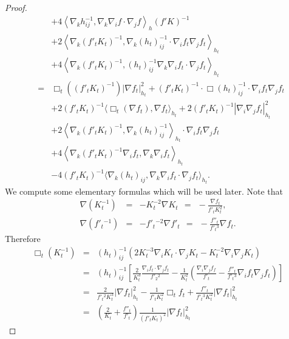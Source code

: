 \documentclass{amsart}
\theoremstyle{definition}
\theoremstyle{remark}
\numberwithin{equation}{section}
\begin{document}
\begin{proof}
\begin{eqnarray*}
&&+4\left\langle\nabla_{k}h^{-1}_{ij},\nabla_{k}\nabla_{i}f\cdot\nabla_{j}f
\right\rangle_{h}(f'K)^{-1}\\
&&+2\left\langle\nabla_{k}(f'_{t}K_{t})^{-1},\nabla_{k}(h_{t})^{-1}_{ij}
\cdot\nabla_{i}f_{t}\nabla_{j}f_{t}\right\rangle_{h_{t}}\\
&&+4\left\langle\nabla_{k}(f'_{t}K_{t})^{-1},(h_{t})^{-1}_{ij}
\nabla_{k}\nabla_{i}f_{t}\cdot\nabla_{j}f_{t}\right\rangle_{h_{t}}\\
&=&\Box_{t}\left((f'_{t}K_{t})^{-1}\right)|\nabla f_{t}|^{2}_{h_{t}}+
(f'_{t}K_{t})^{-1}\cdot\Box (h_{t})^{-1}_{ij}\cdot\nabla_{i}f_{t}\nabla_{j}f_{t}
\\
&&+2(f'_{t}K_{t})^{-1}\langle\Box_{t}(\nabla f_{t}),\nabla f_{t}\rangle_{h_{t}}+2(f'_{t}K_{t})^{-1}|\nabla_{i}\nabla_{j}f_{t}|^{2}_{h_{t}}\\
&&+2\left\langle\nabla_{k}(f'_{t}K_{t})^{-1},\nabla_{k}(h_{t})^{-1}_{ij}
\right\rangle_{h_{t}}
\cdot\nabla_{i}f_{t}\nabla_{j}f_{t}\\
&&+4\left\langle\nabla_{k}(f'_{t}K_{t})^{-1}\nabla_{i}f_{t},\nabla_{k}
\nabla_{i}f_{t}\right\rangle_{h_{t}}\\
&&-4(f'_{t}K_{t})^{-1}\langle\nabla_{k}(h_{t})_{ij},\nabla_{k}\nabla_{i}f_{t}
\cdot\nabla_{j}f_{t}\rangle_{h_{t}}.
\end{eqnarray*}
We compute some elementary formulas which will be used later. Note that
\begin{eqnarray*}
\nabla(K^{-1}_{t})&=&-K^{-2}_{t}\nabla K_{t} \ \ = \ \
-\frac{\nabla f_{t}}{f'_{t}K^{2}_{t}},\\
\nabla(f'_{t}{}^{-1})&=&-f'_{t}{}^{-2}\nabla f'_{t} \ \ = \ \
-\frac{f''_{t}}{f'_{t}{}^{3}}\nabla f_{t}.
\end{eqnarray*}
Therefore
\begin{eqnarray*}
\Box_{t}(K^{-1}_{t})&=&(h_{t})^{-1}_{ij}\left(2K^{-3}_{t}\nabla_{i}K_{t}\cdot\nabla_{j}K_{t}
-K^{-2}_{t}\nabla_{i}\nabla_{j}K_{t}\right)\\
&=&(h_{t})^{-1}_{ij}\left[\frac{2}{K^{3}_{t}}\frac{\nabla_{i}f_{t}
\cdot\nabla_{j}f_{t}}{f'_{2}{}^{2}}
-\frac{1}{K^{2}_{t}}\left(\frac{\nabla_{i}\nabla_{j}f_{f}}{f'_{t}}
-\frac{f''_{t}}{f'_{t}{}^{3}}\nabla_{i}f_{t}\nabla_{j}f_{t}\right)\right]\\
&=&\frac{2}{f'_{t}{}^{2}K^{3}_{t}}|\nabla f_{t}|^{2}_{h_{t}}
-\frac{1}{f'_{t}K^{2}_{t}}\Box_{t} f_{t}+\frac{f''_{t}}{f'_{t}{}^{3}K^{2}_{t}}
|\nabla f_{t}|^{2}_{h_{t}}\\
&=&\left(\frac{2}{K_{t}}+\frac{f''_{t}}{f'_{t}}\right)\frac{1}{(f'_{t}K_{t})^{2}}|\nabla f_{t}|^{2}_{h_{t}}

\end{eqnarray*}
\end{proof}
\end{document}

